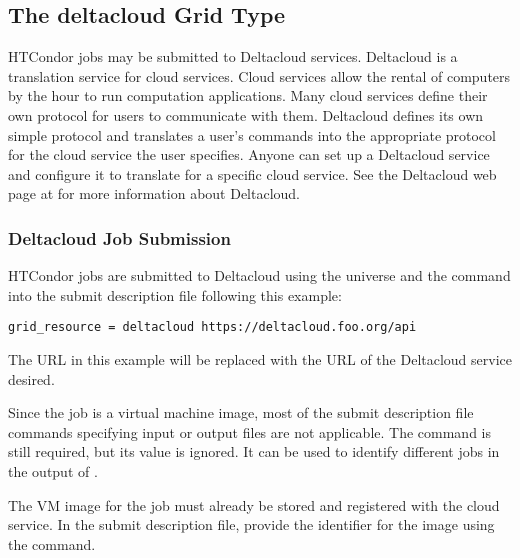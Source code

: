 \subsection{\label{sec:Deltacloud}The deltacloud Grid Type }

HTCondor jobs may be submitted to Deltacloud services.
Deltacloud is a translation service for cloud services.
Cloud services allow the rental of computers by the hour to run
computation applications.
Many cloud services define their own protocol for users to communicate
with them.
Deltacloud defines its own simple protocol and translates a user's
commands into the appropriate protocol for the cloud service the user
specifies.
Anyone can set up a Deltacloud service and configure it to translate
for a specific cloud service.
See the Deltacloud web page at 
for more information about Deltacloud.

\subsubsection{\label{sec:Deltacloud-submit}Deltacloud Job Submission}

HTCondor jobs are submitted to Deltacloud
using the  universe and the
 command
into the submit description file
following this example:
\begin{verbatim}
grid_resource = deltacloud https://deltacloud.foo.org/api
\end{verbatim}

The URL in this example will be replaced with the URL of the
Deltacloud service desired.

Since the job is a virtual machine image,
most of the submit description file commands
specifying input or output files are not applicable.
The  command is still required,
but its value is ignored. 
It can be used to identify different jobs in the output of .

The VM image for the job must already be stored and registered with the
cloud service.
In the submit description file,
provide the identifier for the image using the
 command.

